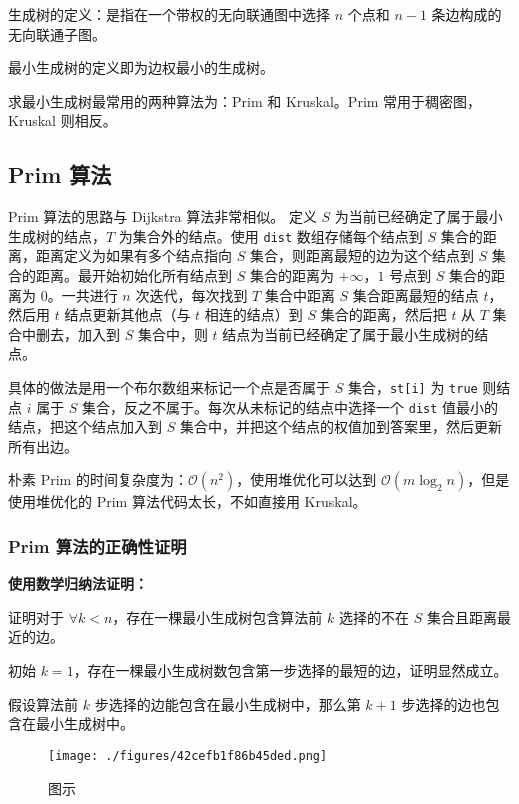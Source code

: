

生成树的定义：是指在一个带权的无向联通图中选择 $n$ 个点和 $n - 1$ 条边构成的无向联通子图。

最小生成树的定义即为边权最小的生成树。

求最小生成树最常用的两种算法为：Prim 和 Kruskal。Prim 常用于稠密图，Kruskal 则相反。

\subsection{Prim 算法}

Prim 算法的思路与 Dijkstra 算法非常相似。
定义 $S$ 为当前已经确定了属于最小生成树的结点，$T$ 为集合外的结点。使用 \verb|dist| 数组存储每个结点到 $S$ 集合的距离，距离定义为如果有多个结点指向 $S$ 集合，则距离最短的边为这个结点到 $S$ 集合的距离。最开始初始化所有结点到 $S$ 集合的距离为 $+\infty$，$1$ 号点到 $S$ 集合的距离为 $0$。一共进行 $n$ 次迭代，每次找到 $T$ 集合中距离 $S$ 集合距离最短的结点 $t$，然后用 $t$ 结点更新其他点（与 $t$ 相连的结点）到 $S$ 集合的距离，然后把 $t$ 从 $T$ 集合中删去，加入到 $S$ 集合中，则 $t$ 结点为当前已经确定了属于最小生成树的结点。

具体的做法是用一个布尔数组来标记一个点是否属于 $S$ 集合，\verb|st[i]| 为 \verb|true| 则结点 $i$ 属于 $S$ 集合，反之不属于。每次从未标记的结点中选择一个 \verb|dist| 值最小的结点，把这个结点加入到 $S$ 集合中，并把这个结点的权值加到答案里，然后更新所有出边。

朴素 Prim 的时间复杂度为：$\mathcal{O}(n^2)$，使用堆优化可以达到 $\mathcal{O}(m \log_2 n)$，但是使用堆优化的 Prim 算法代码太长，不如直接用 Kruskal。

\subsubsection{Prim 算法的正确性证明}

\textbf{使用数学归纳法证明：}

证明对于 $\forall k < n$，存在一棵最小生成树包含算法前 $k$ 选择的不在 $S$ 集合且距离最近的边。

初始 $k = 1$，存在一棵最小生成树数包含第一步选择的最短的边，证明显然成立。

假设算法前 $k$ 步选择的边能包含在最小生成树中，那么第 $k + 1$ 步选择的边也包含在最小生成树中。

\begin{figure}[ht]
\centering
\texttt{[image: ./figures/42cefb1f86b45ded.png]}
\caption{图示} \label{fig_Prim_1}
\end{figure}

